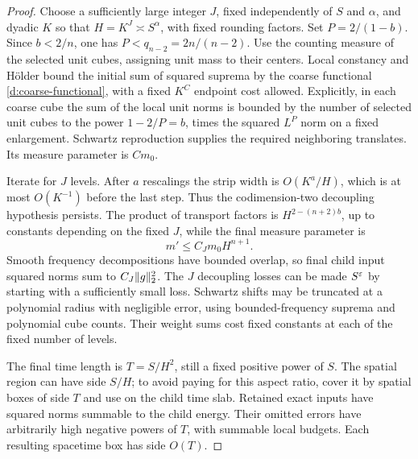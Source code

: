\begin{proof}
Choose a sufficiently large integer $J$, fixed independently of $S$
and $\alpha$, and dyadic $K$ so that
$H=K^J\asymp S^\alpha$, with fixed rounding factors.
Set $P=2/(1-b)$.  Since $b<2/n$, one has
$P<q_{n-2}=2n/(n-2)$.
Use the counting measure of the selected unit cubes, assigning unit
mass to their centers.  Local constancy and Hölder bound the initial
sum of squared suprema by the coarse functional
\eqref{d:coarse-functional}, with a fixed $K^C$ endpoint cost allowed.
Explicitly, in each coarse cube the sum of the local unit norms is
bounded by the number of selected unit cubes to the power
$1-2/P=b$, times the squared $L^P$ norm on a fixed enlargement.
Schwartz reproduction supplies the required neighboring translates.
Its measure parameter is $Cm_0$.

Iterate  for $J$ levels.
After $a$ rescalings the strip width is $O(K^a/H)$, which is at most
$O(K^{-1})$ before the last step.  Thus the codimension-two decoupling
hypothesis persists.  The product of transport factors is
$H^{2-(n+2)b}$, up to constants depending on the fixed $J$, while the
final measure parameter is
\[
 m'\le C_Jm_0H^{n+1}.
\]
Smooth frequency decompositions have bounded overlap, so final child
input squared norms sum to $C_J\lVert g\rVert_2^2$.
The $J$ decoupling losses can be made $S^\varepsilon$ by starting with a
sufficiently small loss.  Schwartz shifts may be truncated at a
polynomial radius with negligible error, using bounded-frequency
suprema and polynomial cube counts.  Their weight sums cost fixed
constants at each of the fixed number of levels.

The final time length is
$T=S/H^2$, still a fixed positive power of $S$.
The spatial region can have side $S/H$; to avoid paying for this
aspect ratio, cover it by spatial boxes of side $T$ and use
 on the child time slab.  Retained exact inputs
have squared norms summable to the child energy.  Their omitted
errors have arbitrarily high negative powers of $T$, with summable
local budgets.  Each resulting spacetime box has side $O(T)$.


\end{proof}
